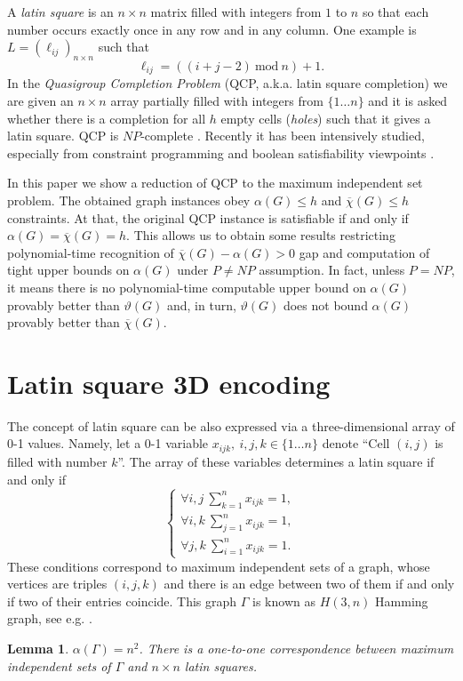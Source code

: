 \documentclass[11pt]{article}
\newtheorem{lem}{Lemma}
\begin{document}
A {\em latin square} is an $n \times n$ matrix filled with integers from $1$
to $n$ so that each number occurs exactly once in any row and in any column. One 
example is $L=(\ell_{ij})_{n \times n}$ such that
\begin{equation}
\label{eq:zn}
\ell_{ij} = ((i+j-2) \ \textrm{mod} \ n) + 1.
\end{equation}
In the {\em Quasigroup Completion Problem} (QCP, a.k.a. latin square completion) 
we are given an $n \times n$ array partially filled with integers from
$\{1 \ldots n\}$ and it is asked whether there is a completion for all $h$ empty 
cells ({\em holes}) such that it gives a latin square. QCP is $NP$-complete 
\cite{C84}. Recently it has been intensively studied, especially from constraint 
programming and boolean satisfiability viewpoints
\cite{GS97,P00,DGKS00,KRAGSS01,GS02,GS02LP,GRS03}.

In this paper we show a reduction of QCP to the maximum independent set
problem. The obtained graph instances obey $\alpha(G) \le h$ and
$\overline{\chi}(G) \le h$ constraints. At that, the original QCP instance
is satisfiable if and only if $\alpha(G)=\overline{\chi}(G)=h$. This allows
us to obtain some results restricting polynomial-time recognition of 
$\overline{\chi}(G)-\alpha(G)>0$ gap and computation of tight upper bounds on 
$\alpha(G)$ under $P \neq NP$ assumption. In fact, unless $P=NP$, it means there 
is no polynomial-time computable upper bound on $\alpha(G)$ provably better than 
$\vartheta(G)$ and, in turn, $\vartheta(G)$ does not bound $\alpha(G)$ provably 
better than $\overline{\chi}(G)$.

\section{Latin square 3D encoding}
The concept of latin square can be also expressed via a three-dimensional
array of 0-1 values. Namely, let a 0-1 variable $x_{ijk}, \ i,j,k \in \{1 \ldots n\}$
denote ``Cell $(i,j)$ is filled with number $k$''. The array of these 
variables determines a latin square if and only if
\begin{equation}
\label{eq:qcp3d}
\left \{ \begin{array}{l}
\forall i,j \ \sum_{k=1}^n x_{ijk} = 1, \\
\forall i,k \ \sum_{j=1}^n x_{ijk} = 1, \\
\forall j,k \ \sum_{i=1}^n x_{ijk} = 1.
\end{array} \right.
\end{equation}
These conditions correspond to maximum independent sets of a graph, whose
vertices are triples $(i,j,k)$ and there is an edge between two of them
if and only if two of their entries coincide. This graph $\Gamma$ is known as 
$H(3,n)$ Hamming graph, see e.g. \cite{BI84}.
\begin{lem}
\label{lem:qcp_3d}
$\alpha(\Gamma)=n^2$. There is a one-to-one correspondence between maximum 
independent sets of $\Gamma$ and $n \times n$ latin squares.
\end{lem}
\end{document}
